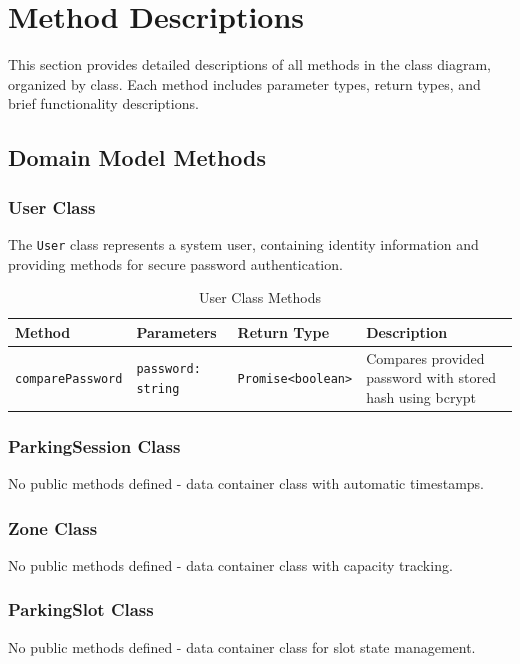 \section{Method Descriptions}

This section provides detailed descriptions of all methods in the class diagram, organized by class. Each method includes parameter types, return types, and brief functionality descriptions.

\subsection{Domain Model Methods}

\subsubsection{User Class}
The \texttt{User} class represents a system user, containing identity information and providing methods for secure password authentication.

\begin{table}[H]
\centering
\footnotesize
\renewcommand{\arraystretch}{1.3}
\begin{tabularx}{\textwidth}{|>{\RaggedRight\arraybackslash}X|>{\RaggedRight\arraybackslash}X|>{\RaggedRight\arraybackslash}X|>{\RaggedRight\arraybackslash}X|}
\hline
\textbf{Method} & \textbf{Parameters} & \textbf{Return Type} & \textbf{Description} \\
\hline
\texttt{comparePassword} & \texttt{password: string} & \texttt{Promise<boolean>} & Compares provided password with stored hash using bcrypt \\
\hline
\end{tabularx}
\caption{User Class Methods}
\label{tab:user-methods}
\end{table}

\subsubsection{ParkingSession Class}
No public methods defined - data container class with automatic timestamps.

\subsubsection{Zone Class}
No public methods defined - data container class with capacity tracking.

\subsubsection{ParkingSlot Class}
No public methods defined - data container class for slot state management.

